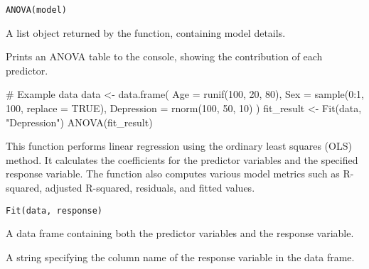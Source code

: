 \documentclass[a4paper]{book}
\begin{document}
%
\begin{Usage}
\begin{verbatim}
ANOVA(model)
\end{verbatim}
\end{Usage}
%
\begin{Arguments}
\begin{ldescription}
\item[\code{model}] A list object returned by the  function, containing model details.
\end{ldescription}
\end{Arguments}
%
\begin{Value}
Prints an ANOVA table to the console, showing the contribution of each predictor.
\end{Value}
%
\begin{Examples}
\begin{ExampleCode}
# Example data
data <- data.frame(
  Age = runif(100, 20, 80),
  Sex = sample(0:1, 100, replace = TRUE),
  Depression = rnorm(100, 50, 10)
)
fit_result <- Fit(data, "Depression")
ANOVA(fit_result)
\end{ExampleCode}
\end{Examples}
%
\begin{Description}
This function performs linear regression using the ordinary least squares (OLS) method.
It calculates the coefficients for the predictor variables and the specified response variable.
The function also computes various model metrics such as R-squared, adjusted R-squared,
residuals, and fitted values.
\end{Description}
%
\begin{Usage}
\begin{verbatim}
Fit(data, response)
\end{verbatim}
\end{Usage}
%
\begin{Arguments}
\begin{ldescription}
\item[\code{data}] A data frame containing both the predictor variables and the response variable.

\item[\code{response}] A string specifying the column name of the response variable in the data frame.
\end{ldescription}
\end{Arguments}
%
\end{document}
